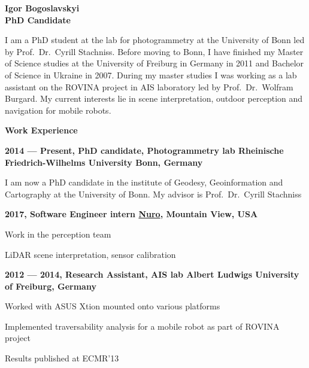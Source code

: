 \documentclass[a4paper,12pt,final]{memoir}
\newcommand{\Sep}{\vspace{1.5em}}
\newcommand{\SmallSep}{\vspace{0.5em}}
\newenvironment{AboutMe}
	{\ignorespaces}
	{\Sep\ignorespacesafterend}
\newcommand{\CVSection}[1]
	{\Large\textbf{#1}\par
	\SmallSep\normalsize\normalfont}
\newcommand{\CVItem}[1]
	{\textbf{\color{MidnightBlue} #1}}
\begin{document}
\framebreak{}


\Huge\bfseries {\color{MidnightBlue} Igor Bogoslavskyi} \\
\Large\bfseries  PhD Candidate \\

\normalsize\normalfont{}

\begin{AboutMe}
I am a PhD student at the lab for photogrammetry at the University of Bonn led
by Prof.~Dr.~Cyrill Stachniss. Before moving to Bonn, I have finished my
Master of Science studies at the University of Freiburg in Germany in 2011 and
Bachelor of Science in Ukraine in 2007. During my master studies I was working
as a lab assistant on the ROVINA project in AIS laboratory led by
Prof.~Dr.~Wolfram Burgard. My current interests lie in scene interpretation,
outdoor perception and navigation for mobile robots.
\end{AboutMe}

\CVSection{Work Experience}
\CVItem{2014 --- Present, PhD candidate, Photogrammetry lab
\newline Rheinische Friedrich-Wilhelms University Bonn, Germany}
\begin{compactitem}[\color{RoyalBlue}$\circ$]
\item I am now a PhD candidate in the institute of Geodesy, Geoinformation and
Cartography at the University of Bonn. My advisor is Prof.~Dr.~Cyrill
Stachniss
\end{compactitem}
\SmallSep

\CVItem{2017, Software Engineer intern
\newline \href{https://nuro.ai/}{Nuro}, Mountain View, USA}
\begin{compactitem}[\color{MidnightBlue}$\circ$]
\item Work in the perception team
\item LiDAR scene interpretation, sensor calibration
\end{compactitem}

\CVItem{2012 --- 2014, Research Assistant, AIS lab
\newline Albert Ludwigs University of Freiburg, Germany}
\begin{compactitem}[\color{RoyalBlue}$\circ$]
\item Worked with ASUS Xtion mounted onto various platforms
\item Implemented traversability analysis for a mobile robot as part of ROVINA
project
\item Results published at ECMR'13
\end{compactitem}
\SmallSep
\end{document}
